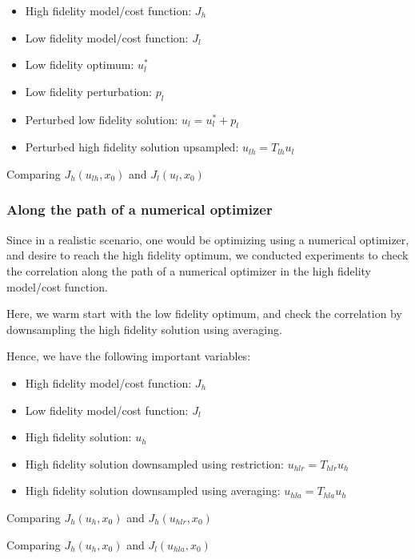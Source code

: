 \documentclass{article}
\begin{document}
\begin{itemize}
  \item High fidelity model/cost function: $J_h$
  \item Low fidelity model/cost function: $J_l$
  \item Low fidelity optimum: $u_l^*$
  \item Low fidelity perturbation: $p_l$
  \item Perturbed low fidelity solution: $u_l = u_l^* + p_l$
  \item Perturbed high fidelity solution upsampled: $u_{lh} = T_{lh} u_l$
\end{itemize}

Comparing $J_h(u_{lh}, x_0)$ and $J_l(u_l, x_0)$

\subsubsection{Along the path of a numerical optimizer}

Since in a realistic scenario, one would be optimizing using a numerical optimizer, and desire to reach the high fidelity optimum,
we conducted experiments to check the correlation along the path of a numerical optimizer in the high fidelity model/cost function.

Here, we warm start with the low fidelity optimum, and check the correlation by downsampling the high fidelity solution using averaging.

Hence, we have the following important variables:

\begin{itemize}
  \item High fidelity model/cost function: $J_h$
  \item Low fidelity model/cost function: $J_l$
  \item High fidelity solution: $u_h$
  \item High fidelity solution downsampled using restriction: $u_{hlr} = T_{hlr} u_h$
  \item High fidelity solution downsampled using averaging: $u_{hla} = T_{hla} u_h$
\end{itemize}

Comparing $J_h(u_h, x_0)$ and $J_h(u_{hlr}, x_0)$

Comparing $J_h(u_h, x_0)$ and $J_l(u_{hla}, x_0)$
\end{document}
